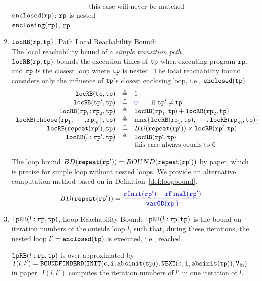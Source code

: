 \begin{enumerate}
\[\begin{array}{rcl}
        &  & \text{this case will never be matched}
        \end{array}
      \]
%
      $\mathtt{enclosed}(\mathtt{rp})$:  $\mathtt{rp}$ is nested
      \\
      $\mathtt{enclosing}(\mathtt{rp})$:  $\mathtt{rp}$
%
\item $\mathtt{locRB}(\mathtt{rp}, \mathtt{tp})$, Path Local Reachability Bound:
\\
The local reachability bound of a \emph{simple transition path}. 
\\
$\mathtt{locRB}(\mathtt{rp}, \mathtt{tp})$ bounds the execution times of $\mathtt{tp}$ when executing program $\mathtt{rp}$,
and $\mathtt{rp}$ is the closest loop where $\mathtt{tp}$ is nested.
The local reachability bound  considers only the influence of $\mathtt{tp}$'s closest enclosing loop, i.e., $\mathtt{enclosed}(\mathtt{tp})$.
%
\[
  \begin{array}{rcl}
    \outinB(\tpath, \tpath) & \triangleq & 1 \\
    \outinB(\tpath', \tpath) & \triangleq & \highlight{0} \qquad \text{if } \tpath' \neq \tpath\\
    \outinB(\rprog_1;\rprog_2, \tpath) & \triangleq & \outinB(\rprog_1, \tpath) + \outinB(\rprog_2, \tpath) \\
    \outinB(\rpchoose{\rprog_1, \cdots, \rprog_m }, \tpath) & \triangleq 
    & \max\left\{ \outinB(\rprog_1, \tpath), \cdots, \outinB(\rprog_m, \tpath) \right\} \\
    \outinB(\rprepeat(\rprog'), \tpath) & \triangleq 
    & BD(\rprepeat(\rprog'))
     \times \outinB(\rprog', \tpath)
     \\
    \outinB(l: \rprog', \tpath) & \triangleq & \outinB(\rprog', \tpath) \\
    &  & \text{this case always equals to } 0 \\
  \end{array}
  \]

  The loop bound $BD(\mathtt{repeat}(\mathtt{rp}')) = BOUND(\mathtt{repeat}(\mathtt{rp}'))$ by paper\cite{GulwaniJK09}, which is precise for simple loop without nested loops. 
  We provide an alternative computation method based on \cite{sinn2017complexity} in Definition~\ref{def:loopbound}.
  \[
    BD(\rprepeat(\rprog')) = \highlight{\frac{\rfinit(\rprog') - \rffinal(\rprog')}{\varGD(\rprog')}}
\]
      \item $\mathtt{lpRB}(l: \mathtt{rp}, \mathtt{tp})$,
      {Loop Reachability Bound}:
        $\mathtt{lpRB}(l: \mathtt{rp}, \mathtt{tp})$
        is the bound on iteration numbers of the outside loop $l$,
        such that,
        during these iterations, the nested loop $l' = \mathtt{enclosed(\mathtt{tp})}$ is executed, i.e., reached.
        
        $\mathtt{lpRB}(l:\mathtt{rp}, \mathtt{tp})$ is over-approximated by
        $I(l, l') = \mathtt{BOUNDFINDERD(INIT(c, i, \mathtt{abs}{\mathtt{init}}(\mathtt{tp})), NEXT(c, i, \mathtt{abs}{\mathtt{init}}(\mathtt{tp})), V_{\ln})}$ in paper\cite{GulwaniJK09}.
        $I(l, l')$ computes the iteration numbers of $l'$ in one iteration of $l$.
\end{enumerate}